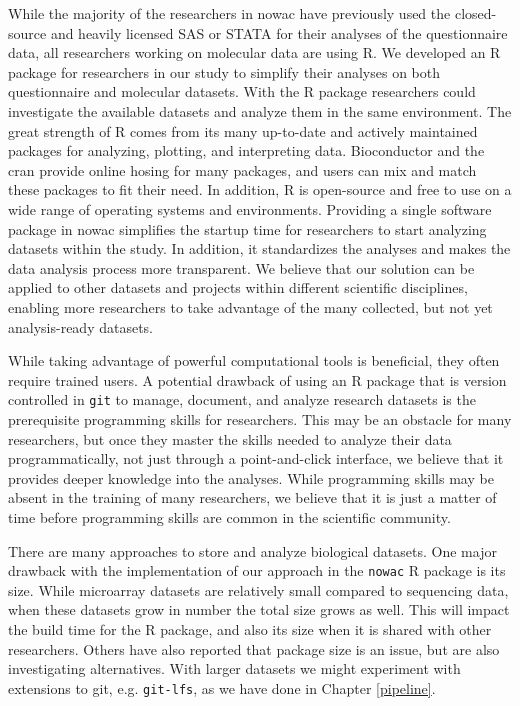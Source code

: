 While the majority of the researchers in \gls{nowac} have previously used the
closed-source and heavily licensed SAS or STATA for their analyses of the
questionnaire data, all researchers working on molecular data are using R.
We developed an R package for researchers in our study to simplify
their analyses on both questionnaire and molecular datasets.  With
the R package researchers could investigate the available datasets and analyze
them in the same environment. The great strength of R comes from its many
up-to-date and actively maintained packages for analyzing, plotting, and
interpreting data. Bioconductor\cite{bioconductor} and the \gls{cran}\cite{cran}
provide online hosing for many packages, and users can mix and match these
packages to fit their need. In addition, R is open-source and free to use on a
wide range of operating systems and environments. Providing a single software
package in \gls{nowac} simplifies the startup time for researchers to start
analyzing datasets within the study.  In addition, it standardizes the analyses
and makes the data analysis process more transparent.  We believe that our
solution can be applied to other datasets and projects within different
scientific disciplines, enabling more researchers to take advantage of the many
collected, but not yet analysis-ready datasets. 

While taking advantage of powerful computational tools is beneficial, they often
require trained users. A potential drawback of using an R package that is
version controlled in \texttt{git} to manage, document, and analyze research
datasets is the prerequisite programming skills for researchers. This may be an
obstacle for many researchers, but once they master the skills needed to analyze
their data programmatically, not just through a point-and-click interface, we
believe that it provides deeper knowledge into the analyses. While programming
skills may be absent in the training of many researchers, we believe that it is
just a matter of time before programming skills are common in the scientific
community. 

There are many approaches to store and analyze biological datasets. One major
drawback with the implementation of our approach in the \texttt{nowac} R package
is its size. While microarray datasets are relatively small compared to
sequencing data, when these datasets grow in number the total size grows as
well. This will impact the build time for the R package, and also its size
when it is shared with other researchers. Others have also reported that package
size is an issue, but are also investigating
alternatives.\cite{finak2018datapackager} With larger datasets we might
experiment with extensions to git, e.g. \texttt{git-lfs}, as we have done in
Chapter \ref{pipeline}.

